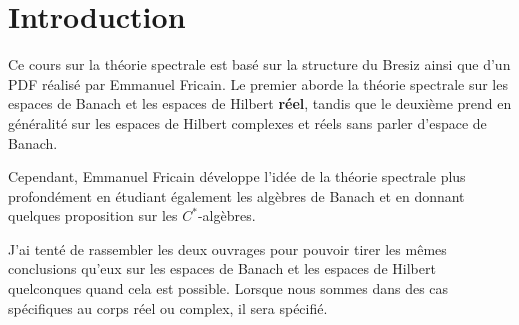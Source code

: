 \section{Introduction}

Ce cours sur la théorie spectrale est basé sur la structure du Bresiz ainsi que
d'un PDF réalisé par Emmanuel Fricain.
Le premier aborde la théorie spectrale sur les espaces de Banach et les
espaces de Hilbert \textbf{réel}, tandis que le deuxième prend en généralité sur
les espaces de Hilbert complexes et réels sans parler d'espace de Banach.

Cependant, Emmanuel Fricain développe l'idée de la théorie spectrale plus
profondément en étudiant également les algèbres de Banach et en donnant quelques
proposition sur les $C^{*}$-algèbres.

J'ai tenté de rassembler les deux ouvrages pour pouvoir tirer les mêmes
conclusions qu'eux sur les espaces de Banach et les espaces
de Hilbert quelconques quand cela est possible. Lorsque nous sommes dans des cas
spécifiques au corps réel ou complex, il sera spécifié.

